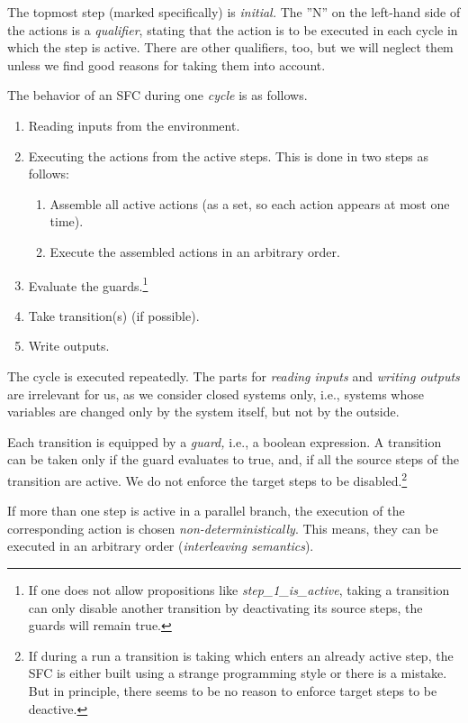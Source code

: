 The topmost step (marked specifically) is \emph{initial.}  The ''N'' on the
left-hand side of the actions is a \emph{qualifier}, stating that the action
is to be executed in each cycle in which the step is active. There are other
qualifiers, too, but we will neglect them unless we find good reasons for
taking them into account.

The behavior of an SFC during one \emph{cycle} is as follows.
\begin{enumerate}
\item Reading inputs from the environment.
\item Executing the actions from the active steps.  This is done in two steps
  as follows:
  \begin{enumerate}
  \item Assemble all active actions (as a set, so each action appears at most
    one time).
  \item Execute the assembled actions in an arbitrary order.
  \end{enumerate}
\item Evaluate the guards.\footnote{If one does not allow propositions like
    \emph{step\_1\_is\_active}, taking a transition can only disable another
    transition by deactivating its source steps, the guards will remain true.}
\item Take transition(s) (if possible).
\item Write outputs.
\end{enumerate}
The cycle is executed repeatedly.  The parts for \emph{reading inputs} and
\emph{writing outputs} are irrelevant for us, as we consider closed systems
only, i.e., systems whose variables are changed only by the system itself, but
not by the outside.

Each transition is equipped by a \emph{guard,} i.e., a boolean expression. A
transition can be taken only if the guard evaluates to true, and, if all the
source steps of the transition are active.  We do not enforce the target steps
to be disabled.\footnote{If during a run a transition is taking which enters
  an already active step, the SFC is either built using a strange programming
  style or there is a mistake.  But in principle, there seems to be no reason
  to enforce target steps to be deactive.}

If more than one step is active in a parallel branch, the execution of the
corresponding action is chosen \emph{non-deterministically}. This means,
they can be executed in an arbitrary order (\emph{interleaving semantics}).

